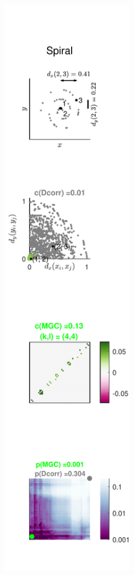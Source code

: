 \documentclass[11pt]{article}
\begin{document}
\begin{figure}[htbp]
{\includegraphics[width=0.5\textwidth]{../Figures/Fig8}
}
\end{figure}
\end{document}

